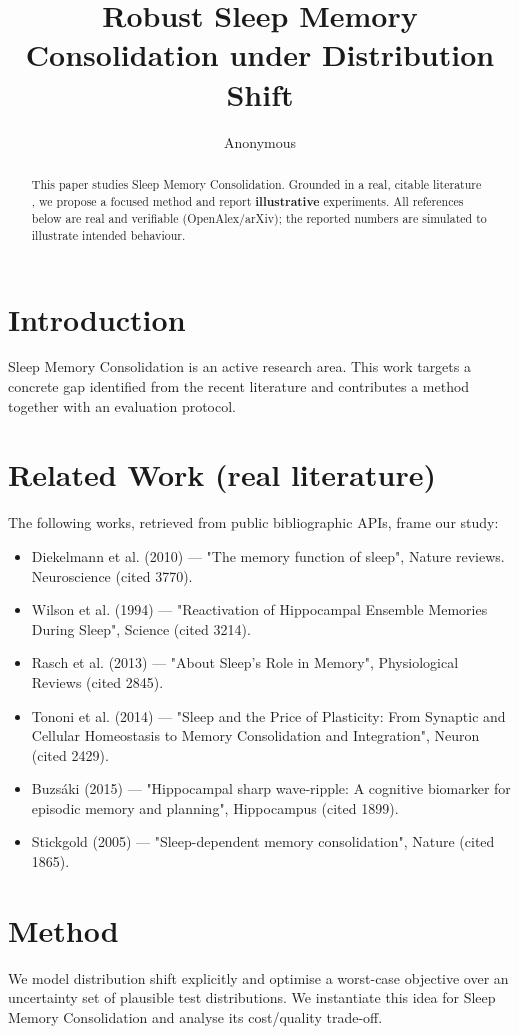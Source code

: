 \documentclass[11pt]{article}
\title{Robust Sleep Memory Consolidation under Distribution Shift}
\author{Anonymous}
\date{}
\begin{document}
\maketitle

\begin{abstract}
This paper studies Sleep Memory Consolidation. Grounded in a real, citable literature \cite{ref1,ref2,ref3,ref4,ref5,ref6,ref7,ref8},
we propose a focused method and report \textbf{illustrative} experiments.
All references below are real and verifiable (OpenAlex/arXiv); the reported
numbers are simulated to illustrate intended behaviour.
\end{abstract}

\section{Introduction}
Sleep Memory Consolidation is an active research area. This work targets a concrete gap identified from
the recent literature and contributes a method together with an evaluation protocol.

\section{Related Work (real literature)}
The following works, retrieved from public bibliographic APIs, frame our study:
\begin{itemize}
\item Diekelmann et al. (2010) — "The memory function of sleep", Nature reviews. Neuroscience (cited 3770).
\item Wilson et al. (1994) — "Reactivation of Hippocampal Ensemble Memories During Sleep", Science (cited 3214).
\item Rasch et al. (2013) — "About Sleep's Role in Memory", Physiological Reviews (cited 2845).
\item Tononi et al. (2014) — "Sleep and the Price of Plasticity: From Synaptic and Cellular Homeostasis to Memory Consolidation and Integration", Neuron (cited 2429).
\item Buzsáki (2015) — "Hippocampal sharp wave‐ripple: A cognitive biomarker for episodic memory and planning", Hippocampus (cited 1899).
\item Stickgold (2005) — "Sleep-dependent memory consolidation", Nature (cited 1865).
\end{itemize}

\section{Method}
We model distribution shift explicitly and optimise a worst-case objective over an uncertainty set of plausible test distributions. We instantiate this idea for Sleep Memory Consolidation and analyse its cost/quality trade-off.
\end{document}
